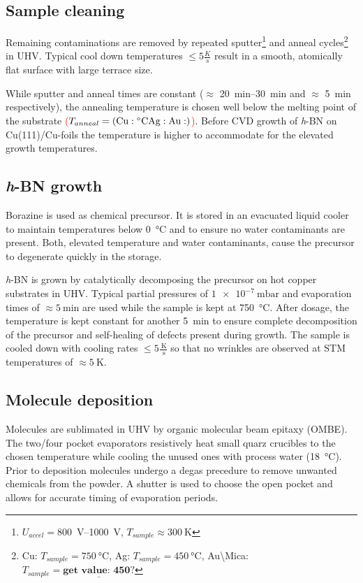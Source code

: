 \subsection{Sample cleaning}
\label{sec:sample-cleaning}
Remaining contaminations 
are removed by repeated sputter\footnote{$U_{accel}=$\SIrange{800}{1000}{\volt}, $T_{sample}\approx \SI{300}{\kelvin}$} and anneal cycles\footnote{Cu: $T_{sample}=\SI{750}{\celsius}$, Ag: $T_{sample}=\SI{450}{\celsius}$, Au\textbackslash Mica: $T_{sample}= \underline{\textbf{get value: 450?}}$} in UHV. Typical cool down temperatures $\leq 5 \frac{K}{s}$ result in a smooth, atomically flat surface with large terrace size. 

While sputter and anneal times are constant ($\approx$ \SIrange{20}{30}{\minute} and $\approx$ \SI{5}{\minute} respectively), the annealing temperature is chosen well below the melting point of the substrate \textcolor{red}{($T_{anneal}=(\textnormal{Cu}: \SI{}{\celsius} \textnormal{Ag}: \textnormal{Au}: )$)}. Before CVD growth of \textit{h}-BN on Cu(111)/Cu-foils the temperature is higher to accommodate for the elevated growth temperatures.

\subsection{\textit{h}-BN growth}
Borazine is used as chemical precursor. It is stored in an evacuated liquid cooler to maintain temperatures below \SI{0}{\celsius} and to ensure no water contaminants are present. Both, elevated temperature and water contaminants, cause the precursor to degenerate quickly in the storage.

\textit{h}-BN is grown by catalytically decomposing the precursor on hot copper substrates in UHV. Typical partial pressures of $\SI{1e-7}{\milli \bar}$ and evaporation times of $\approx \SI{5}{\minute}$ are used while the sample is kept at \SI{750}{\celsius}. After dosage, the temperature is kept constant for another \SI{5}{\minute} to ensure complete decomposition of the precursor and self-healing of defects present during growth. The sample is cooled down with cooling rates $\leq 5 \frac{\SI{}{\kelvin}}{\SI{}{\second}}$ so that no wrinkles are observed at STM temperatures of $\approx \SI{5}{\kelvin}$.

\subsection{Molecule deposition}
Molecules are sublimated in UHV by organic molecular beam epitaxy (OMBE). The two/four pocket evaporators resistively heat small quarz crucibles to the chosen temperature while cooling the unused ones with process water (\SI{18}{\celsius}). Prior to deposition molecules undergo a degas precedure to remove unwanted chemicals from the powder. A shutter is used to choose the open pocket and allows for accurate timing of evaporation periods.


